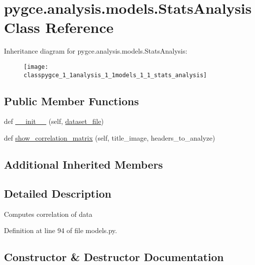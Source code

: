 \hypertarget{classpygce_1_1analysis_1_1models_1_1_stats_analysis}{}\section{pygce.\+analysis.\+models.\+Stats\+Analysis Class Reference}
\label{classpygce_1_1analysis_1_1models_1_1_stats_analysis}
Inheritance diagram for pygce.\+analysis.\+models.\+Stats\+Analysis\+:\begin{figure}[H]
\begin{center}
\leavevmode
\texttt{[image: classpygce\_1\_1analysis\_1\_1models\_1\_1\_stats\_analysis]}
\end{center}
\end{figure}
\subsection*{Public Member Functions}
\begin{DoxyCompactItemize}
\item 
def \hyperlink{classpygce_1_1analysis_1_1models_1_1_stats_analysis_a161706ff9c5a5410356e28a240ea5e29}{\+\_\+\+\_\+init\+\_\+\+\_\+} (self, \hyperlink{classpygce_1_1analysis_1_1models_1_1_garmin_data_filter_a7bb7be05577c2d31546e27823a5d11c5}{dataset\+\_\+file})
\item 
def \hyperlink{classpygce_1_1analysis_1_1models_1_1_stats_analysis_a2dd9052d1133c137c3049c6a425f8722}{show\+\_\+correlation\+\_\+matrix} (self, title\+\_\+image, headers\+\_\+to\+\_\+analyze)
\end{DoxyCompactItemize}
\subsection*{Additional Inherited Members}


\subsection{Detailed Description}
\begin{DoxyVerb}Computes correlation of data\end{DoxyVerb}
 

Definition at line 94 of file models.\+py.



\subsection{Constructor \& Destructor Documentation}
